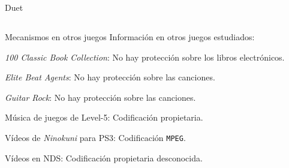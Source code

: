 \begin{frame}{Duet}

\end{frame}

\subsection{}
\begin{frame}{Mecanismos en otros juegos}
Información en otros juegos estudiados:

\begin{wideitemize}
    \item<+-> \textit{100 Classic Book Collection}: No hay protección sobre los libros electrónicos.

    \item<+-> \textit{Elite Beat Agents}: No hay protección sobre las canciones.

    \item<+-> \textit{Guitar Rock}: No hay protección sobre las canciones.

    \item<+-> Música de juegos de Level-5: Codificación propietaria.

    \item<+-> Vídeos de \textit{Ninokuni} para PS3: Codificación \texttt{MPEG}.

    \item<+-> Vídeos en NDS: Codificación propietaria desconocida.
\end{wideitemize}
\end{frame}

